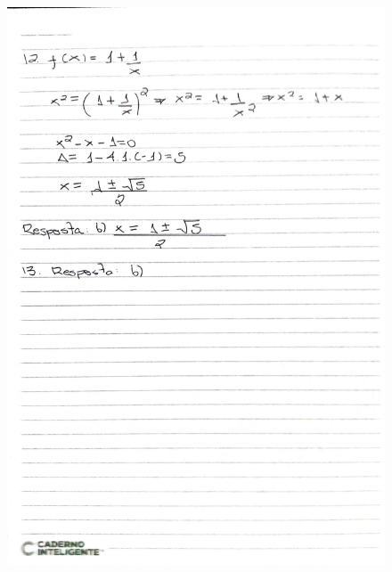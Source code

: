 \documentclass[
  12pt,     %
  openright,      %
  oneside,      %
  a4paper     %
  ]{abntex2}
\begin{document}
\begin{figure}[H]
  \centering
  \includegraphics[scale=0.23]{pagina18.jpg}
\end{figure}
\end{document}
